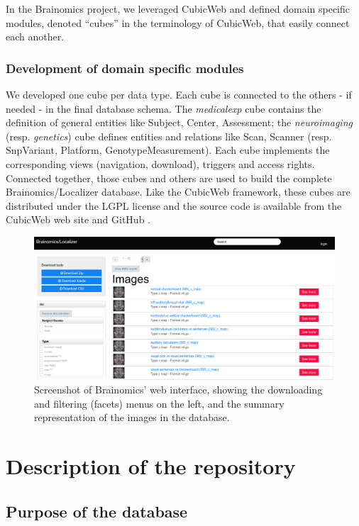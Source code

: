 \documentclass[review]{elsarticle}
\begin{document}
In the Brainomics project, we leveraged CubicWeb and defined domain specific modules, denoted ``cubes'' in the terminology of CubicWeb, that easily connect each another.


\subsubsection{Development of domain specific modules}

We developed one cube per data type. Each cube is connected to the others - if needed - in the final database schema. The \textit{medicalexp} cube contains the definition of general entities like Subject, Center, Assessment; the \textit{neuroimaging} (resp. \textit{genetics}) cube defines entities and relations like Scan, Scanner (resp. SnpVariant, Platform, GenotypeMeasurement). Each cube implements the corresponding views (navigation, download), triggers and access rights. Connected together, those cubes and others are used to build the complete Brainomics/Localizer database. Like the CubicWeb framework, these cubes are distributed under the LGPL license and the source code is available from the CubicWeb web site \cite{CubicWeb} and GitHub \cite{Localizer}.


\begin{figure}[ht!]
    \includegraphics[width=\textwidth]{ui1}
    \caption{Screenshot of Brainomics' web interface, showing the downloading and filtering (facets) menus on the left, and the summary representation of the images in the database.}
    \label{fig:ui}
\end{figure}



\section{Description of the repository}

\subsection{Purpose of the database}
\end{document}
